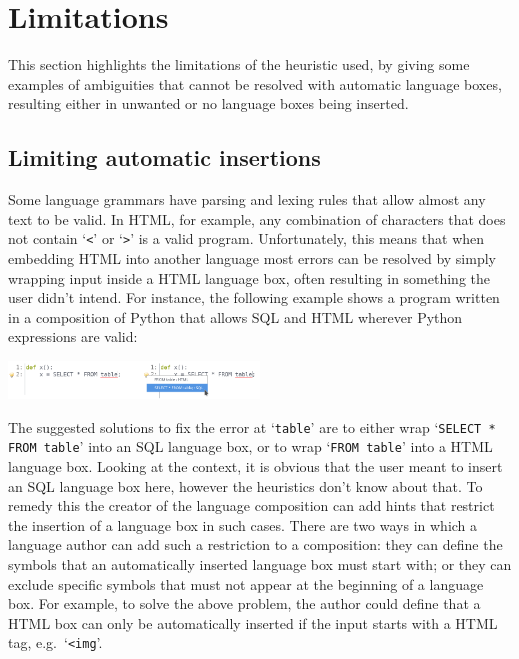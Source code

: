\documentclass[sigplan,screen]{acmart}\settopmatter{printfolios=true,printccs=false,printacmref=false}
\newcommand{\qtt}[1]{`\texttt{#1}'\xspace}
\begin{document}
\section{Limitations}
\label{sec_lbox_limitations}

This section highlights the limitations of the heuristic used, by giving some
examples of ambiguities that cannot be resolved with automatic language boxes,
resulting either in unwanted or no language boxes being inserted.


\subsection{Limiting automatic insertions}
\label{subsec:limitingautoinserts}

Some language grammars have parsing and lexing rules that allow almost any text to be valid.
In HTML, for example, any combination of characters that does not contain
\qtt{<} or \qtt{>} is a valid program. Unfortunately, this means that when
embedding HTML into another language most errors can be resolved by simply wrapping input inside a
HTML language box, often resulting in something the user didn't intend. For
instance, the following example shows a program written in a composition of
Python that allows SQL and HTML wherever Python expressions are valid:

\begin{center}
\includegraphics[width=0.5\textwidth]{images/auto_html.png}
\end{center}

The suggested solutions to fix the error at \qtt{table} are to either wrap
\qtt{SELECT * FROM table} into an SQL language box, or to wrap
\qtt{FROM table} into a HTML language box. Looking at the context, it is obvious
that the user meant to insert an SQL language box here, however the heuristics don't
know about that. To remedy this the creator of the language composition can add hints that
restrict the insertion of a language box in such cases. There are two ways in which
a language author can add such a restriction to a composition: they can define
the symbols that an automatically inserted language box must start with;
or they can exclude specific symbols that must not appear at the beginning of a
language box. For example, to solve the above problem, the author could define
that a HTML box can only be automatically inserted if the input starts with a HTML tag,
e.g.~\qtt{<img}.
\end{document}

